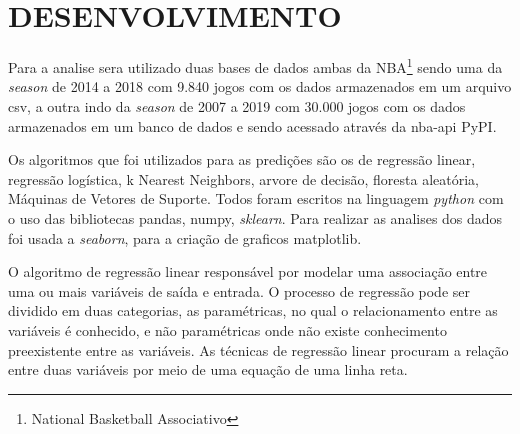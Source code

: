 \section{DESENVOLVIMENTO}

Para a analise sera utilizado duas bases de dados ambas da NBA\footnote{National Basketball Associativo} sendo uma da \textit{season} de 2014 a 2018 com 9.840 jogos com os dados armazenados em um arquivo csv, a outra indo da  \textit{season} de 2007 a 2019 com 30.000 jogos com os dados armazenados em um banco de dados e sendo acessado através da  nba-api  PyPI. 

Os algoritmos que foi utilizados para as predições são os de regressão linear, regressão logística, k Nearest Neighbors,  arvore de decisão, floresta aleatória,  Máquinas de Vetores de Suporte. Todos foram escritos na linguagem \textit{python} com o uso das bibliotecas  pandas, numpy, \textit{sklearn}. Para realizar as analises dos dados foi usada a \textit{seaborn}, para a criação de graficos matplotlib.


O algoritmo de regressão linear responsável por modelar uma associação entre uma ou mais variáveis de saída e entrada. O processo de regressão pode ser dividido em duas categorias, as paramétricas, no qual o relacionamento entre as variáveis é conhecido, e não paramétricas onde não existe conhecimento preexistente entre as variáveis. As técnicas de regressão linear procuram a relação entre duas variáveis por meio de uma equação de uma linha reta.
